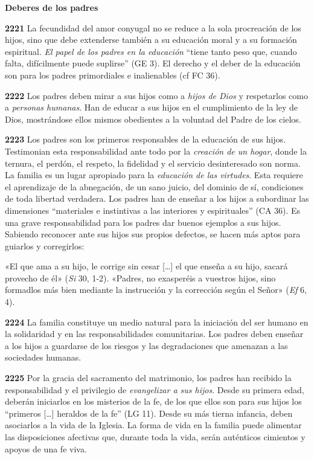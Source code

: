 \documentclass[]{article}
\begin{document}
\textbf{Deberes de los padres}

\textbf{2221} La fecundidad del amor conyugal no se reduce a la sola
procreación de los hijos, sino que debe extenderse también a su
educación moral y a su formación espiritual. \emph{El papel de los
padres en la educación} ``tiene tanto peso que, cuando falta,
difícilmente puede suplirse'' (GE 3). El derecho y el deber de la
educación son para los padres primordiales e inalienables (cf FC 36).

\textbf{2222} Los padres deben mirar a sus hijos como a \emph{hijos de
Dios} y respetarlos como a \emph{personas humanas}. Han de educar a sus
hijos en el cumplimiento de la ley de Dios, mostrándose ellos mismos
obedientes a la voluntad del Padre de los cielos.

\textbf{2223} Los padres son los primeros responsables de la educación
de sus hijos. Testimonian esta responsabilidad ante todo por la
\emph{creación de un hogar}, donde la ternura, el perdón, el respeto, la
fidelidad y el servicio desinteresado son norma. La familia es un lugar
apropiado para la \emph{educación de las virtudes}. Esta requiere el
aprendizaje de la abnegación, de un sano juicio, del dominio de sí,
condiciones de toda libertad verdadera. Los padres han de enseñar a los
hijos a subordinar las dimensiones ``materiales e instintivas a las
interiores y espirituales'' (CA 36). Es una grave responsabilidad para
los padres dar buenos ejemplos a sus hijos. Sabiendo reconocer ante sus
hijos sus propios defectos, se hacen más aptos para guiarlos y
corregirlos:

«El que ama a su hijo, le corrige sin cesar [\ldots{}] el que enseña a su
hijo, sacará provecho de él» (\emph{Si} 30, 1-2). «Padres, no exasperéis
a vuestros hijos, sino formadlos más bien mediante la instrucción y la
corrección según el Señor» (\emph{Ef} 6, 4).

\textbf{2224} La familia constituye un medio natural para la iniciación
del ser humano en la solidaridad y en las responsabilidades
comunitarias. Los padres deben enseñar a los hijos a guardarse de los
riesgos y las degradaciones que amenazan a las sociedades humanas.

\textbf{2225} Por la gracia del sacramento del matrimonio, los padres
han recibido la responsabilidad y el privilegio de \emph{evangelizar a
sus hijos}. Desde su primera edad, deberán iniciarlos en los misterios
de la fe, de los que ellos son para sus hijos los ``primeros [\ldots{}]
heraldos de la fe'' (LG 11). Desde su más tierna infancia, deben
asociarlos a la vida de la Iglesia. La forma de vida en la familia puede
alimentar las disposiciones afectivas que, durante toda la vida, serán
auténticos cimientos y apoyos de una fe viva.
\end{document}
